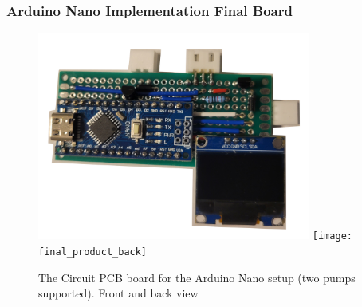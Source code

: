 \documentclass{article}
\begin{document}
		\subsubsection{Arduino Nano Implementation Final Board}
		\begin{figure}[H] 
			\centering %
			\includegraphics[width=0.8\textwidth]{final_product_front}
			\texttt{[image: final\_product\_back]}
			\caption{\footnotesize The Circuit PCB board for the Arduino Nano setup (two pumps supported). Front and back view}
			\label{fig:Arduino Nano Setup 3}
		\end{figure}
\end{document}
